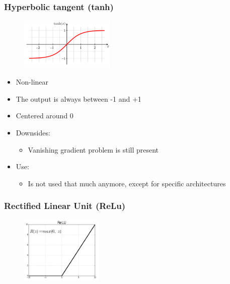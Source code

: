 \documentclass{article}
\begin{document}
\subsubsection{Hyperbolic tangent (tanh)}

\begin{figure}[H]
    \centering
    \includegraphics[width=0.4\textwidth]{tanh.png}
\end{figure}


\begin{itemize}
    \item Non-linear
    \item The output is always between -1 and +1
    \item Centered around 0
    \item Downsides:
    \begin{itemize}
        \item Vanishing gradient problem is still present
    \end{itemize}
    \item Use:
    \begin{itemize}
        \item Is not used that much anymore, except for specific architectures
    \end{itemize}
\end{itemize}

\subsubsection{Rectified Linear Unit (ReLu)}

\begin{figure}[H]
    \centering
    \includegraphics[width=0.35\textwidth]{relu.png}
\end{figure}
\end{document}
